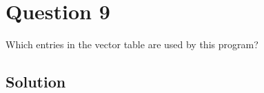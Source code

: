 \section*{Question 9}

Which entries in the vector table are used by this program?

\subsection*{Solution}
